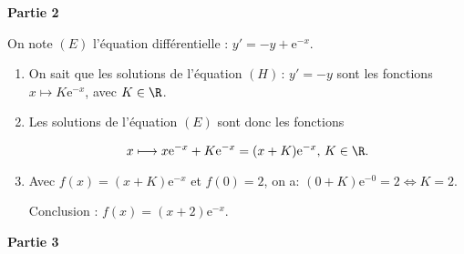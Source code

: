 \bigskip

\begin{center}\textbf{Partie 2}\end{center}

On note $(E)$ l'équation différentielle : $y' = -y + \text{e}^{-x}$.


\medskip

\begin{enumerate}
\item %
On sait que les solutions de l'équation $(H)\,:\, y'=-y$ sont les fonctions $x \longmapsto K\text{e}^{-x}$, avec $K \in \R$.
\item %
Les solutions de l'équation $(E)$ sont donc les fonctions 

\[x \longmapsto x\text{e}^{-x} + K\text{e}^{-x} = (x + K)\text{e}^{-x},\, K \in \R.\]

\item %
Avec $f(x) = (x + K)\text{e}^{-x}$ et 
$f(0) = 2$, on a: $(0+K)\text{e}^{-0} = 2 \iff K = 2$.

Conclusion : $f(x) = (x + 2)\text{e}^{-x}$.
\end{enumerate}

\bigskip

\begin{center}\textbf{Partie 3}\end{center}


\medskip

